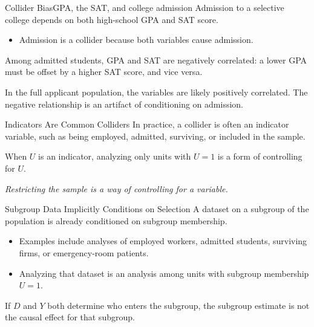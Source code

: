 \documentclass[aspectratio=169,t,11pt,table]{beamer}
\begin{document}
\begin{frame}{Collider Bias}{GPA, the SAT, and college admission}
  Admission to a selective college depends on both high-school GPA and SAT score.
  \begin{itemize}
    \item Admission is a collider because both variables cause admission.
  \end{itemize}

  \pause
  \bigskip
  Among admitted students, GPA and SAT are \alert{negatively} correlated: a lower GPA must be offset by a higher SAT score, and vice versa.

  \pause
  \bigskip
  In the full applicant population, the variables are likely positively correlated. The negative relationship is an artifact of conditioning on admission.
\end{frame}

\begin{frame}{Indicators Are Common Colliders}
  In practice, a collider is often an indicator variable, such as being employed, admitted, surviving, or included in the sample.

  \pause
  \bigskip
  When $U$ is an indicator, \alert{analyzing only units with $U = 1$} is a form of controlling for $U$.

  \pause
  \bigskip
  \begin{center}
    \emph{Restricting the sample is a way of controlling for a variable.}
  \end{center}
\end{frame}

\begin{frame}{Subgroup Data Implicitly Conditions on Selection}
  A dataset on a subgroup of the population is already conditioned on subgroup membership.
  \begin{itemize}
    \item Examples include analyses of employed workers, admitted students, surviving firms, or emergency-room patients.
    \item Analyzing that dataset is an analysis among units with subgroup membership $U=1$.
  \end{itemize}

  \pause
  \bigskip
  If $D$ and $Y$ both determine who enters the subgroup, the subgroup estimate is \alert{not} the causal effect for that subgroup.
\end{frame}
\end{document}
